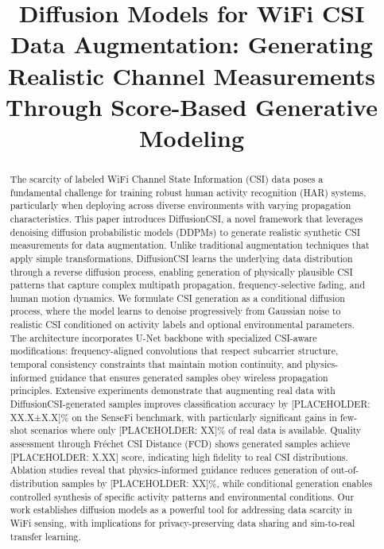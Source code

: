 \documentclass[journal]{IEEEtran}
\begin{document}
\title{Diffusion Models for WiFi CSI Data Augmentation: Generating Realistic Channel Measurements Through Score-Based Generative Modeling}

\author{
}

\maketitle

\begin{abstract}
The scarcity of labeled WiFi Channel State Information (CSI) data poses a fundamental challenge for training robust human activity recognition (HAR) systems, particularly when deploying across diverse environments with varying propagation characteristics. This paper introduces DiffusionCSI, a novel framework that leverages denoising diffusion probabilistic models (DDPMs) to generate realistic synthetic CSI measurements for data augmentation. Unlike traditional augmentation techniques that apply simple transformations, DiffusionCSI learns the underlying data distribution through a reverse diffusion process, enabling generation of physically plausible CSI patterns that capture complex multipath propagation, frequency-selective fading, and human motion dynamics. We formulate CSI generation as a conditional diffusion process, where the model learns to denoise progressively from Gaussian noise to realistic CSI conditioned on activity labels and optional environmental parameters. The architecture incorporates U-Net backbone with specialized CSI-aware modifications: frequency-aligned convolutions that respect subcarrier structure, temporal consistency constraints that maintain motion continuity, and physics-informed guidance that ensures generated samples obey wireless propagation principles. Extensive experiments demonstrate that augmenting real data with DiffusionCSI-generated samples improves classification accuracy by [PLACEHOLDER: XX.X±X.X]\% on the SenseFi benchmark, with particularly significant gains in few-shot scenarios where only [PLACEHOLDER: XX]\% of real data is available. Quality assessment through Fréchet CSI Distance (FCD) shows generated samples achieve [PLACEHOLDER: X.XX] score, indicating high fidelity to real CSI distributions. Ablation studies reveal that physics-informed guidance reduces generation of out-of-distribution samples by [PLACEHOLDER: XX]\%, while conditional generation enables controlled synthesis of specific activity patterns and environmental conditions. Our work establishes diffusion models as a powerful tool for addressing data scarcity in WiFi sensing, with implications for privacy-preserving data sharing and sim-to-real transfer learning.
\end{abstract}
\end{document}
